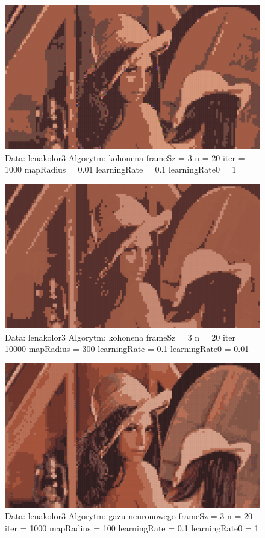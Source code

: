 \documentclass{classrep}
\begin{document}
{{{\begin{figure}[h!]
\centering
 \includegraphics[width=12cm]{img/kohonen_5.png}
 \vspace{-0.0cm}
 \caption{Data: lenakolor3 Algorytm: kohonena frameSz = 3 n = 20 iter = 1000 mapRadius = 0.01 learningRate = 0.1 learningRate0 = 1
}
\end{figure}

\newpage

\begin{figure}[h!]
\centering
 \includegraphics[width=12cm]{img/kohonen_6.png}
 \vspace{-0.0cm}
 \caption{Data: lenakolor3 Algorytm: kohonena frameSz = 3 n = 20 iter = 10000 mapRadius = 300 learningRate = 0.1 learningRate0 = 0.01
}
\end{figure}

\begin{figure}[h!]
\centering
 \includegraphics[width=12cm]{img/neural_1.png}
 \vspace{-0.0cm}
 \caption{Data: lenakolor3 Algorytm: gazu neuronowego frameSz = 3 n = 20 iter = 1000 mapRadius = 100 learningRate = 0.1 learningRate0 = 1
}
\end{figure}

}}}
\end{document}
